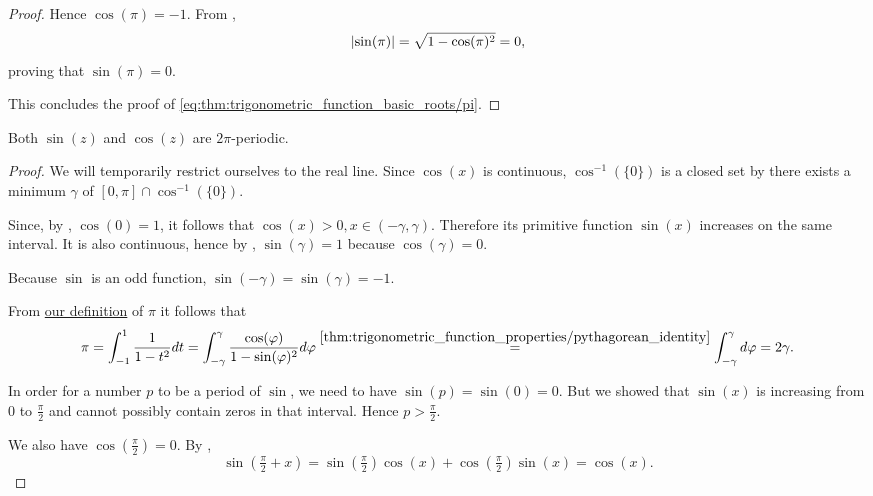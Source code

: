\begin{proof}
  Hence \( \cos(\pi) = -1 \). From ,
  \begin{equation*}
    \left\vert \sin(\pi) \right\vert = \sqrt{1 - \cos(\pi)^2} = 0,
  \end{equation*}
  proving that \( \sin(\pi) = 0 \).

  This concludes the proof of \ref{eq:thm:trigonometric_function_basic_roots/pi}.
\end{proof}

\begin{theorem}\label{thm:trigonometric_function_period}
  Both \( \sin(z) \) and \( \cos(z) \) are \( 2\pi \)-periodic.
\end{theorem}
\begin{proof}
  We will temporarily restrict ourselves to the real line. Since \( \cos(x) \) is continuous, \( \cos^{-1}(\{ 0 \}) \) is a closed set by  there exists a minimum \( \gamma \) of \( [0, \pi] \cap \cos^{-1}(\{ 0 \}) \).

  Since, by , \( \cos(0) = 1 \), it follows that \( \cos(x) > 0, x \in (-\gamma, \gamma) \). Therefore its primitive function \( \sin(x) \) increases on the same interval. It is also continuous, hence by , \( \sin(\gamma) = 1 \) because \( \cos(\gamma) = 0 \).

  Because \( \sin \) is an odd function, \( \sin(-\gamma) = \sin(\gamma) = -1 \).

  From \hyperref[def:pi]{our definition} of \( \pi \) it follows that
  \begin{equation*}
    \pi
    =
    \int_{-1}^1 \frac 1 {1 - t^2} dt
    =
    \int_{-\gamma}^\gamma \frac {\cos(\varphi)} {1 - \sin(\varphi)^2} d\varphi
    \overset {\ref{thm:trigonometric_function_properties/pythagorean_identity}} =
    \int_{-\gamma}^\gamma d\varphi
    =
    2\gamma.
  \end{equation*}

  In order for a number \( p \) to be a period of \( \sin \), we need to have \( \sin(p) = \sin(0) = 0 \). But we showed that \( \sin(x) \) is increasing from \( 0 \) to \( \tfrac \pi 2 \) and cannot possibly contain zeros in that interval. Hence \( p > \tfrac \pi 2 \).

  We also have \( \cos(\tfrac \pi 2) = 0 \). By ,
  \begin{equation*}
    \sin(\tfrac \pi 2 + x)
    =
    \sin(\tfrac \pi 2) \cos(x) + \cos(\tfrac \pi 2) \sin(x)
    =
    \cos(x).
  \end{equation*}


\end{proof}
